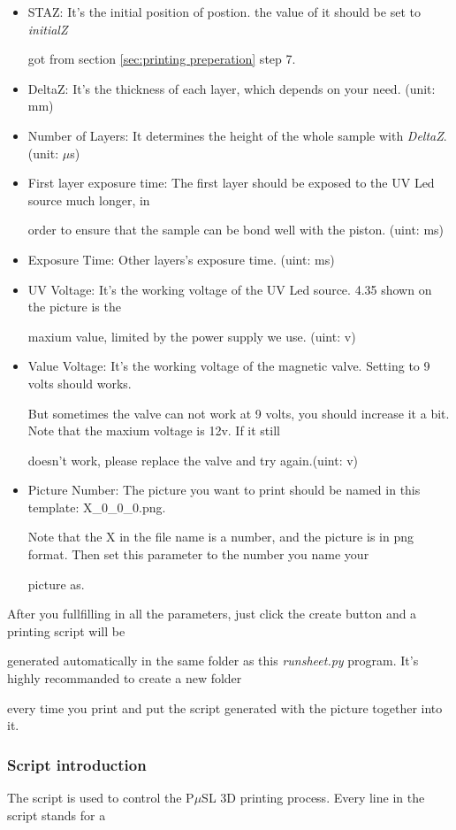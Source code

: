 \documentclass[a4paper]{article}
\begin{document}
\begin{itemize}
  \item STAZ: It's the initial position of postion. the value of it should be set to \textit{initialZ} 

got from section 
  \ref{sec:printing preperation} step 7.
  \item DeltaZ: It's the thickness of each layer, which depends on your need. (unit: mm)
  \item Number of Layers: It determines the height of the whole sample with \textit{DeltaZ}. (unit: $\mu

$s)
  \item First layer exposure time: The first layer should be exposed to the UV Led source much longer, in 

order to ensure 
  that the sample can be bond well with the piston. (uint: ms)
  \item Exposure Time: Other layers's exposure time. (uint: ms)
  \item UV Voltage: It's the working voltage of the UV Led source. 4.35 shown on the picture is the 

maxium value, limited by the 
  power supply we use.  (uint: v)
  \item Value Voltage: It's the working voltage of the magnetic valve. Setting to 9 volts should works. 

But sometimes the valve 
  can not work at 9 volts, you should increase it a bit. Note that the maxium voltage is 12v. If it still 

doesn't work, 
  please replace the valve and try again.(uint: v)
  \item Picture Number: The picture you want to print should be named in this template: X\_0\_0\_0.png. 

Note that the X in the file 
  name is a number, and the picture is in png format. Then set this parameter to the number you name your 

picture as. 
\end{itemize}
After you fullfilling in all the parameters, just click the create button and a printing script will be 

generated automatically in 
the same folder as this \textit{runsheet.py} program. It's highly recommanded to create a new folder 

every time you print and put 
the script generated with the picture together into it.




\subsubsection{Script introduction}
The script is used to control the P$\mu$SL 3D printing process. Every line in the script stands for a 
\end{document}

